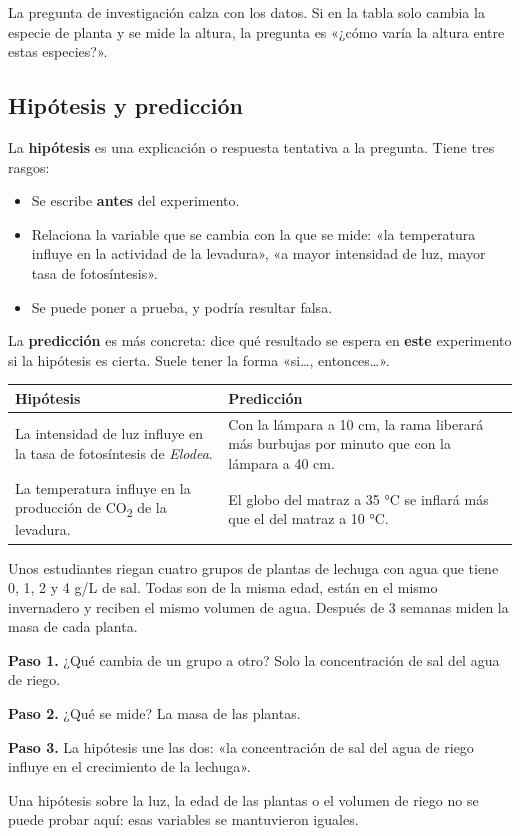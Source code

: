 \begin{clave}[{Recuerda}] La pregunta de investigación calza con los datos. Si en la tabla solo cambia la especie de planta y se mide la altura, la pregunta es «¿cómo varía la altura entre estas especies?».\end{clave}
\subsection{Hipótesis y predicción}
La \textbf{hipótesis} es una explicación o respuesta tentativa a la pregunta. Tiene tres rasgos:

 
\begin{itemize}
  \item Se escribe \textbf{antes} del experimento.
  \item Relaciona la variable que se cambia con la que se mide: «la temperatura influye en la actividad de la levadura», «a mayor intensidad de luz, mayor tasa de fotosíntesis».
  \item Se puede poner a prueba, y podría resultar falsa.
\end{itemize}
 

La \textbf{predicción} es más concreta: dice qué resultado se espera en \textbf{este} experimento si la hipótesis es cierta. Suele tener la forma «si\dots{}, entonces\dots{}».

 
\begin{center}\small
\begin{tabularx}{\linewidth}{@{}>{\raggedright\arraybackslash\hsize=1.00\hsize}X>{\raggedright\arraybackslash\hsize=1.00\hsize}X@{}}
\toprule
\textbf{Hipótesis} & \textbf{Predicción} \\
\midrule
La intensidad de luz influye en la tasa de fotosíntesis de \emph{Elodea}. & Con la lámpara a 10 cm, la rama liberará más burbujas por minuto que con la lámpara a 40 cm. \\
La temperatura influye en la producción de CO\textsubscript{2} de la levadura. & El globo del matraz a 35 °C se inflará más que el del matraz a 10 °C. \\
\bottomrule
\end{tabularx}
\end{center}
  
\begin{ejemplo} Unos estudiantes riegan cuatro grupos de plantas de lechuga con agua que tiene 0, 1, 2 y 4 g/L de sal. Todas son de la misma edad, están en el mismo invernadero y reciben el mismo volumen de agua. Después de 3 semanas miden la masa de cada planta.\par \textbf{Paso 1.} ¿Qué cambia de un grupo a otro? Solo la concentración de sal del agua de riego.\par \textbf{Paso 2.} ¿Qué se mide? La masa de las plantas.\par \textbf{Paso 3.} La hipótesis une las dos: «la concentración de sal del agua de riego influye en el crecimiento de la lechuga».\par Una hipótesis sobre la luz, la edad de las plantas o el volumen de riego no se puede probar aquí: esas variables se mantuvieron iguales.\end{ejemplo}
 

